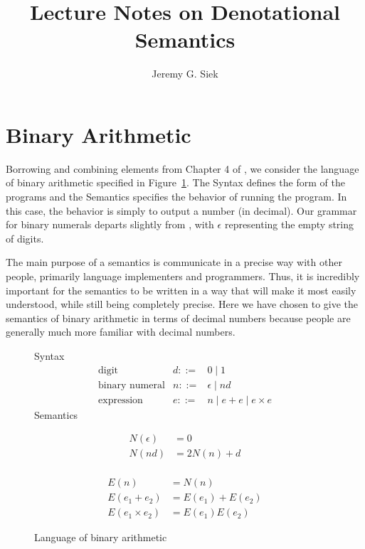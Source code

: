 \documentclass{tufte-handout}
\title{Lecture Notes on Denotational Semantics}
\author{Jeremy G. Siek}
\newcommand{\BR}[1]{(#1)}
\begin{document}
\maketitle

\tableofcontents

\clearpage


\section{Binary Arithmetic}
\label{sec:binary-arithmetic}


Borrowing and combining elements from Chapter 4 of
\citet{Schmidt:1986vn}, we consider the language of binary arithmetic
specified in Figure~\ref{fig:binary-arithmetic}.  The Syntax defines
the form of the programs and the Semantics specifies the behavior of
running the program. In this case, the behavior is simply to output a
number (in decimal).  Our grammar for binary numerals departs slightly
from \citet{Schmidt:1986vn}, with $\epsilon$ representing the empty
string of digits.

The main purpose of a semantics is communicate in a precise way with
other people, primarily language implementers and programmers.  Thus,
it is incredibly important for the semantics to be written in a way
that will make it most easily understood, while still being completely
precise.  Here we have chosen to give the semantics of binary
arithmetic in terms of decimal numbers because people are generally
much more familiar with decimal numbers. 

\begin{figure}
\noindent Syntax
\[
\begin{array}{lrl}
 \text{digit}& d ::=& 0 \mid 1 \\
 \text{binary numeral}& n ::=& \epsilon \mid nd  \\
 \text{expression}& e ::=& n \mid e + e \mid e \times e
\end{array}
\]
Semantics\\
\begin{minipage}{0.4\textwidth}
\begin{align*}
 N\BR{ \epsilon } &= 0 \\
 N\BR{ n d } &= 2 N\BR{ n } + d\\[1ex]
\end{align*}
\end{minipage}
\begin{minipage}{0.6\textwidth}
  \begin{align*}
  E\BR{ n } &= N\BR{ n } \\
 E\BR{ e_1 + e_2 } &= 
    E\BR{ e_1 } + E\BR{ e_2 } \\
 E\BR{ e_1 \times e_2 } &= 
    E\BR{ e_1 } E\BR{ e_2 }
\end{align*}
\end{minipage}
\caption{Language of binary arithmetic}
\label{fig:binary-arithmetic}
\end{figure}
\end{document}
